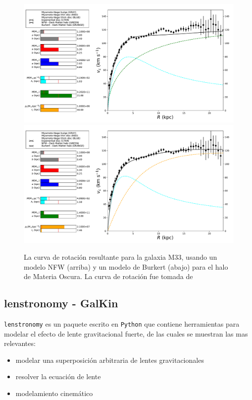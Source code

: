 \begin{figure}
  \centering
    \includegraphics[width=\columnwidth]{Kap2/M33_rot_curve.pdf}
    \includegraphics[width=\columnwidth]{Kap2/M33_Burkert.pdf}
  \caption{La curva de rotación resultante para la galaxia M33, usando un modelo NFW (arriba) y un modelo de Burkert (abajo) para el halo de Materia Oscura. La curva de rotación fue tomada de \cite{C14}}
  \label{fig:FigM33RC}
\end{figure}



\subsection{lenstronomy - GalKin}

\verb+lenstronomy+ es un paquete escrito en \verb+Python+ que contiene herramientas para modelar el efecto de lente gravitacional fuerte, de las cuales se muestran las mas relevantes:

\begin{itemize}
\item modelar una superposición arbitraria de lentes gravitacionales
\item resolver la ecuación de lente
\item modelamiento cinemático
\end{itemize}

